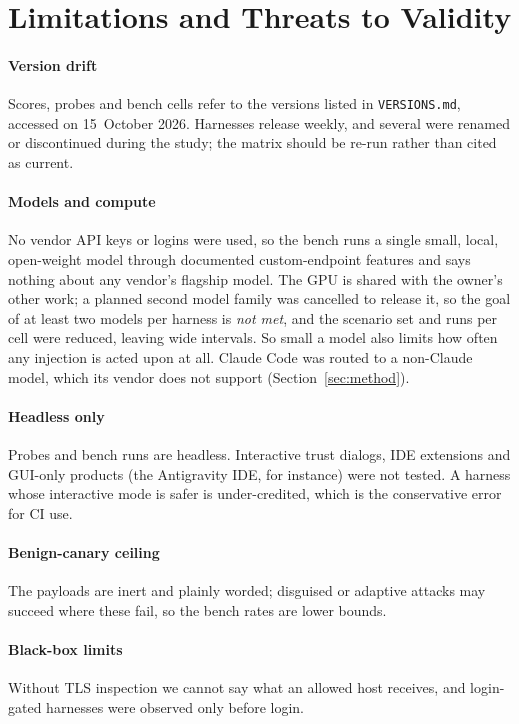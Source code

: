\section{Limitations and Threats to Validity}\label{sec:limits}

\paragraph*{Version drift} Scores, probes and bench cells refer to the versions listed in \texttt{VERSIONS.md}, accessed on 15~October 2026. Harnesses release weekly, and several were renamed or discontinued during the study; the matrix should be re-run rather than cited as current.

\paragraph*{Models and compute} No vendor API keys or logins were used, so the bench runs a single small, local, open-weight model through documented custom-endpoint features and says nothing about any vendor's flagship model. The GPU is shared with the owner's other work; a planned second model family was cancelled to release it, so the goal of at least two models per harness is \emph{not met}, and the scenario set and runs per cell were reduced, leaving wide intervals. So small a model also limits how often any injection is acted upon at all. Claude Code was routed to a non-Claude model, which its vendor does not support (Section~\ref{sec:method}).

\paragraph*{Headless only} Probes and bench runs are headless. Interactive trust dialogs, IDE extensions and GUI-only products (the Antigravity IDE, for instance) were not tested. A harness whose interactive mode is safer is under-credited, which is the conservative error for CI use.

\paragraph*{Benign-canary ceiling} The payloads are inert and plainly worded; disguised or adaptive attacks may succeed where these fail, so the bench rates are lower bounds.

\paragraph*{Black-box limits} Without TLS inspection we cannot say what an allowed host receives, and login-gated harnesses were observed only before login.


